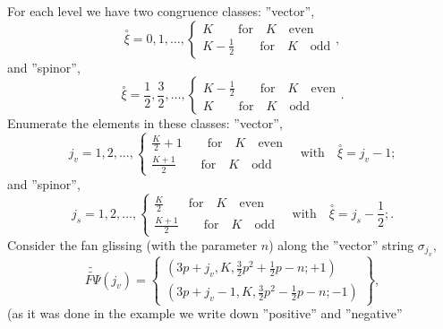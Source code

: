 \documentclass{article}
\begin{document}
For each level we have two congruence classes: ''vector'',
\begin{equation*}
\overset{\circ }{\xi }=0,1,\ldots ,\left\{
\begin{array}{c}
K\qquad \mathrm{for\quad }K\mathrm{\quad even} \\
K-\frac{1}{2}\qquad \mathrm{for\quad }K\mathrm{\quad odd}
\end{array}
\right. ,
\end{equation*}
and ''spinor'',
\begin{equation*}
\overset{\circ }{\xi }=\frac{1}{2},\frac{3}{2},\ldots ,\left\{
\begin{array}{c}
K-\frac{1}{2}\qquad \mathrm{for\quad }K\mathrm{\quad even} \\
K\qquad \mathrm{for\quad }K\mathrm{\quad odd}
\end{array}
\right. .
\end{equation*}
Enumerate the elements in these classes: ''vector'',
\begin{equation*}
j_{v}=1,2,\ldots ,\left\{
\begin{array}{c}
\frac{K}{2}+1\qquad \mathrm{for\quad }K\mathrm{\quad even} \\
\frac{K+1}{2}\qquad \mathrm{for\quad }K\mathrm{\quad odd}
\end{array}
\right. \quad \mathrm{with}\quad \overset{\circ }{\xi }=j_{v}-1;
\end{equation*}
and ''spinor'',
\begin{equation*}
j_{s}=1,2,\ldots ,\left\{
\begin{array}{c}
\frac{K}{2}\qquad \mathrm{for\quad }K\mathrm{\quad even} \\
\frac{K+1}{2}\qquad \mathrm{for\quad }K\mathrm{\quad odd}
\end{array}
\right. \quad \mathrm{with}\quad \overset{\circ }{\xi }=j_{s}-\frac{1}{2};.
\end{equation*}
Consider the fan glissing (with the parameter $n$) along the ''vector''
string $\sigma _{j_{v}}$,
\begin{equation*}
\widetilde{\widetilde{F\Psi }}\left( j_{v}\right) =\left\{
\begin{array}{c}
\left( 3p+j_{v},K,\frac{3}{2}p^{2}+\frac{1}{2}p-n;+1\right)  \\
\left( 3p+j_{v}-1,K,\frac{3}{2}p^{2}-\frac{1}{2}p-n;-1\right)
\end{array}
\right\} ,
\end{equation*}
(as it was done in the example we write down ''positive'' and ''negative''
\end{document}
